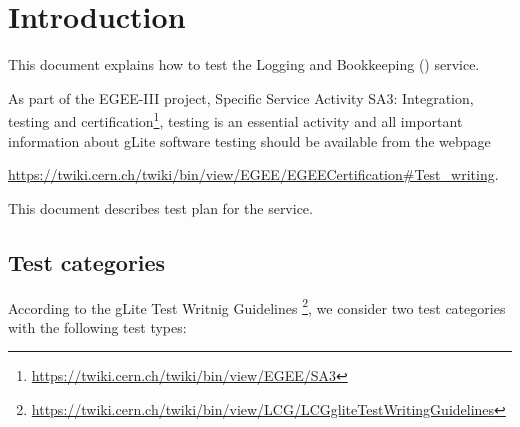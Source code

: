 \section{Introduction}

This document explains how to test the Logging and Bookkeeping (\LB) service.

As part of the EGEE-III project, Specific Service Activity SA3: Integration,
testing and certification\footnote{\url{https://twiki.cern.ch/twiki/bin/view/EGEE/SA3}},
testing is an essential activity and all important information about gLite software
testing should be available from the webpage

\begin{center}
\url{https://twiki.cern.ch/twiki/bin/view/EGEE/EGEECertification#Test_writing}.
\end{center}

This document describes test plan for the \LB service.


\subsection{Test categories}

%

According to the gLite Test Writnig Guidelines
\footnote{\url{https://twiki.cern.ch/twiki/bin/view/LCG/LCGgliteTestWritingGuidelines}},
we consider two test categories with the following test types:

